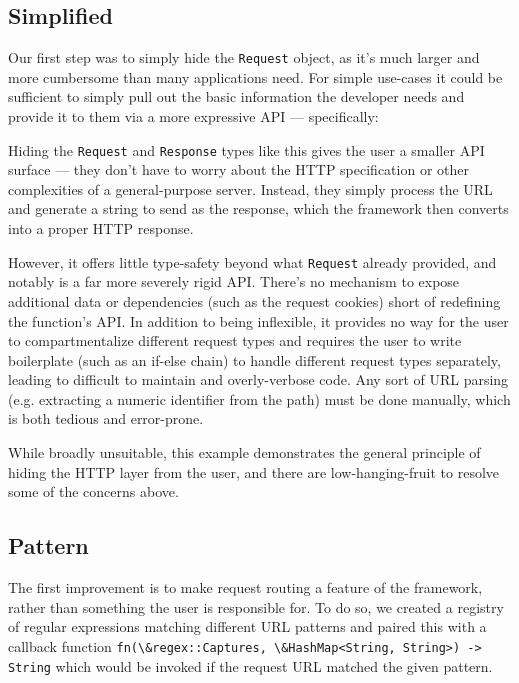 \documentclass[sigconf]{acmart}
\def\code#1{\lstinline{#1}}
\begin{document}
\subsection{Simplified}

Our first step was to simply hide the \code{Request} object, as it's much larger and more cumbersome than many applications need. For simple use-cases it could be sufficient to simply pull out the basic information the developer needs and provide it to them via a more expressive API --- specifically:

\begin{minipage}{\linewidth}

\end{minipage}

Hiding the \code{Request} and \code{Response} types like this gives the user a smaller API surface --- they don't have to worry about the HTTP specification or other complexities of a general-purpose server. Instead, they simply process the URL and generate a string to send as the response, which the framework then converts into a proper HTTP response.

However, it offers little type-safety beyond what \code{Request} already provided, and notably is a far more severely rigid API. There's no mechanism to expose additional data or dependencies (such as the request cookies) short of redefining the function's API. In addition to being inflexible, it provides no way for the user to compartmentalize different request types and requires the user to write boilerplate (such as an if-else chain) to handle different request types separately, leading to difficult to maintain and overly-verbose code. Any sort of URL parsing (e.g. extracting a numeric identifier from the path) must be done manually, which is both tedious and error-prone.

While broadly unsuitable, this example demonstrates the general principle of hiding the HTTP layer from the user, and there are low-hanging-fruit to resolve some of the concerns above.

\subsection{Pattern}

The first improvement is to make request routing a feature of the framework, rather than something the user is responsible for. To do so, we created a registry of regular expressions matching different URL patterns and paired this with a callback function \code{fn(\&regex::Captures, \&HashMap<String, String>) -> String} which would be invoked if the request URL matched the given pattern.
\end{document}

